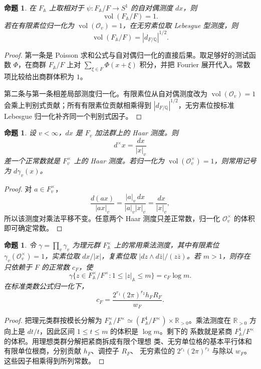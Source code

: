 \documentclass[11pt,a4paper,openany]{ctexbook}
\numberwithin{equation}{chapter}
\newcommand{\Q}{\mathbb{Q}}
\newcommand{\R}{\mathbb{R}}
\newcommand{\A}{\mathbb{A}}
\theoremstyle{plain}
\newtheorem{proposition}[theorem]{命题}
\theoremstyle{definition}
\theoremstyle{remark}
\begin{document}
\begin{proposition}
在 $F_{\A}$ 上取相对于 $\psi:F_{\A}/F\to S^1$ 的自对偶测度 $dx$，则
\[
  \operatorname{vol}(F_{\A}/F)=1.
\]
若在有限素位归一化为 $\operatorname{vol}(\mathcal O_v)=1$，在无穷素位取 Lebesgue 型测度，则
\[
  \operatorname{vol}(F_{\A}/F)=|d_{F/\Q}|^{1/2}.
\]
\end{proposition}

\begin{proof}
第一条是 Poisson 求和公式与自对偶归一化的直接后果。取足够好的测试函数 $\Phi$，在商群 $F_{\A}/F$ 上对 $\sum_{\xi\in F}\Phi(x+\xi)$ 积分，并把 Fourier 展开代入。常数项比较给出商群体积为 $1$。

第二条与第一条相差局部测度归一化。有限素位从自对偶测度改为 $\operatorname{vol}(\mathcal O_v)=1$ 会乘上判别式贡献；所有有限素位贡献相乘得到 $|d_{F/\Q}|^{1/2}$，无穷素位按标准 Lebesgue 归一化补齐同一个判别式因子。
\end{proof}

\begin{proposition}
设 $v<\infty$，$dx$ 是 $F_v$ 加法群上的 Haar 测度。则
\[
  d^\times x=\frac{dx}{|x|_v}
\]
差一个正常数就是 $F_v^\times$ 上的 Haar 测度。若归一化为 $\operatorname{vol}(\mathcal O_v^\times)=1$，则常用记号为 $d\gamma_v(x)$。
\end{proposition}

\begin{proof}
对 $a\in F_v^\times$，
\[
  \frac{d(ax)}{|ax|_v}=\frac{|a|_v\,dx}{|a|_v|x|_v}=\frac{dx}{|x|_v},
\]
所以该测度对乘法平移不变。任意两个 Haar 测度只差正常数，归一化 $\mathcal O_v^\times$ 的体积即可确定常数。
\end{proof}

\begin{proposition}
令 $\gamma=\prod_v\gamma_v$ 为理元群 $F_{\A}^{\times}$ 上的常用乘法测度，其中有限素位
$\gamma_v(\mathcal O_v^\times)=1$，实素位取 $dx/|x|$，复素位取
$|dz\wedge d\bar z|/(z\bar z)$。若 $m>1$，则存在只依赖于 $F$ 的正常数 $c_F$，使
\[
  \gamma\{z\in F_{\A}^{\times}/F^\times:1\le |z|_{\A}\le m\}=c_F\log m.
\]
在标准类数公式归一化下，
\[
  c_F=\frac{2^{r_1}(2\pi)^{r_2}h_FR_F}{w_F}.
\]
\end{proposition}

\begin{proof}
把理元类群按模长分解为
$F_{\A}^{\times}/F^\times\simeq (F_{\A}^{1}/F^\times)\times\R_{>0}$。乘法测度在
$\R_{>0}$ 方向上是 $dt/t$，因此区间 $1\le t\le m$ 的体积是 $\log m$。剩下的
系数就是紧商 $F_{\A}^{1}/F^\times$ 的体积。用理想类群分解把紧商拆成有限个理想
类、无穷单位格的基本平行体和有限单位根商，分别贡献 $h_F$、调控子 $R_F$、
无穷素位的 $2^{r_1}(2\pi)^{r_2}$ 与除以 $w_F$。这些因子相乘得到所列常数。
\end{proof}
\end{document}
